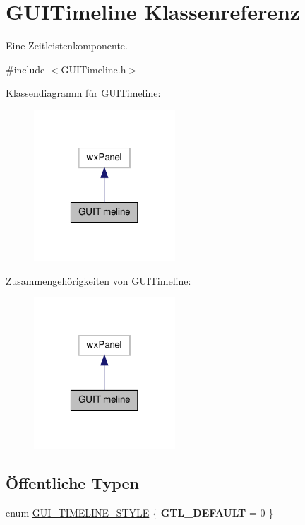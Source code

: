 \hypertarget{classGUITimeline}{\section{G\-U\-I\-Timeline Klassenreferenz}
\label{classGUITimeline}
}


Eine Zeitleistenkomponente.  




{\ttfamily \#include $<$G\-U\-I\-Timeline.\-h$>$}



Klassendiagramm für G\-U\-I\-Timeline\-:\nopagebreak
\begin{figure}[H]
\begin{center}
\leavevmode
\includegraphics[width=150pt]{classGUITimeline__inherit__graph}
\end{center}
\end{figure}


Zusammengehörigkeiten von G\-U\-I\-Timeline\-:\nopagebreak
\begin{figure}[H]
\begin{center}
\leavevmode
\includegraphics[width=150pt]{classGUITimeline__coll__graph}
\end{center}
\end{figure}
\subsection*{Öffentliche Typen}
\begin{DoxyCompactItemize}
\item 
enum \hyperlink{classGUITimeline_a56f1cf170a8c077a0b94d19a0eba8c94}{G\-U\-I\-\_\-\-T\-I\-M\-E\-L\-I\-N\-E\-\_\-\-S\-T\-Y\-L\-E} \{ {\bfseries G\-T\-L\-\_\-\-D\-E\-F\-A\-U\-L\-T} = 0
 \}
\end{DoxyCompactItemize}
